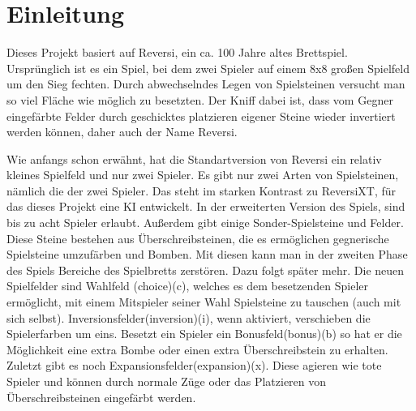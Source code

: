 \documentclass[12pt,a4paper,bibliography=totocnumbered,listof=totocnumbered]{scrartcl}
\begin{document}
    \section{Einleitung}


    Dieses Projekt basiert auf Reversi, ein ca. 100 Jahre altes Brettspiel. Ursprünglich ist es ein Spiel, bei dem zwei Spieler auf einem 8x8 großen Spielfeld um den Sieg fechten. Durch abwechselndes Legen von Spielsteinen versucht man so viel Fläche wie möglich zu besetzten. Der Kniff dabei ist, dass vom Gegner eingefärbte Felder durch geschicktes platzieren eigener Steine wieder invertiert werden können, daher auch der Name Reversi.

    Wie anfangs schon erwähnt, hat die Standartversion von Reversi ein relativ kleines Spielfeld und nur zwei Spieler. Es gibt nur zwei Arten von Spielsteinen, nämlich die der zwei Spieler. Das steht im starken Kontrast zu ReversiXT, für das dieses Projekt eine KI entwickelt. In der erweiterten Version des Spiels, sind bis zu acht Spieler erlaubt. Außerdem gibt einige Sonder-Spielsteine und Felder. Diese Steine bestehen aus \glqq Überschreibsteinen\grqq, die es ermöglichen gegnerische Spielsteine umzufärben und \glqq Bomben\grqq. Mit diesen kann man in der zweiten Phase des Spiels Bereiche des Spielbretts zerstören. Dazu folgt später mehr. Die neuen Spielfelder sind \glqq Wahlfeld\grqq{} (choice)(c), welches es dem besetzenden Spieler ermöglicht, mit einem Mitspieler seiner Wahl Spielsteine zu tauschen (auch mit sich selbst). \glqq Inversionsfelder\grqq (inversion)(i), wenn aktiviert, verschieben die Spielerfarben um eins. Besetzt ein Spieler ein \glqq Bonusfeld\grqq (bonus)(b) so hat er die Möglichkeit eine extra Bombe oder einen extra Überschreibstein zu erhalten. Zuletzt gibt es noch \glqq Expansionsfelder\grqq (expansion)(x). Diese agieren wie \glqq tote\grqq{} Spieler und können durch normale Züge oder das Platzieren von Überschreibsteinen eingefärbt werden.
\end{document}
